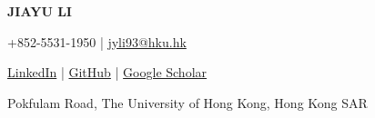 \documentclass[a4paper,11pt]{article}
\newcommand{\socialicon}[1]{\raisebox{-0.05em}{\resizebox{!}{1em}{#1}}}
\newcommand{\ieeeicon}[1]{\raisebox{-0.3em}{\resizebox{!}{1.3em}{#1}}}
\newcommand{\headerfontiii}{\fontfamily{ppl}\selectfont} %
\begin{document}
\headerfontiii

\begin{center}
    {\Huge\textbf{JIAYU LI}}
\end{center}
\vspace{-6mm}

\begin{center}
    \small{
    +852-5531-1950 | \href{mailto:jyli93@hku.hk}{jyli93@hku.hk}
    }
\end{center}
\vspace{-6mm}

\begin{center}
    \small{
    \socialicon{\faLinkedin} \href{https://www.linkedin.com/in/jiayu-li-945537320/}{LinkedIn} | 
    \socialicon{\faGithub} \href{https://github.com/jylicmp}{GitHub} | 
    \socialicon{\faGoogle} \href{https://scholar.google.com/citations?user=XHvrW1sAAAAJ&hl=en}{Google Scholar}
    }
\end{center}
\vspace{-6mm}
\begin{center}
    \small{Pokfulam Road, The University of Hong Kong, Hong Kong SAR}
\end{center}

\vspace{-2mm}

\end{document}
